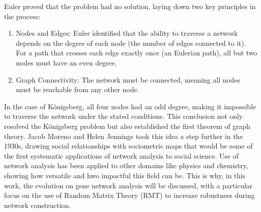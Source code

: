 \documentclass{article}[12pt]
\begin{document}
\noindent Euler proved that the problem had no solution, laying down two key principles in the process:
\begin{enumerate}
    \item Nodes and Edges: Euler identified that the ability to traverse a network depends on the degree of each node (the number of edges connected to it).
    For a path that crosses each edge exactly once (an Eulerian path), all but two nodes must have an even degree.
    \item Graph Connectivity: The network must be connected, meaning all nodes must be reachable from any other node.
\end{enumerate}

\noindent In the case of Königsberg, all four nodes had an odd degree, making it impossible to traverse the network under the stated conditions.
This conclusion not only resolved the Königsberg problem but also established the first theorem of graph theory.
\newpage
Jacob Moreno and Helen Jennings took this idea a step further in the 1930s, drawing social relationships with sociometric maps that would be some of the first systematic applications of network analysis to social science\supercite{moreno_who_1934}.
Use of network analysis has been applied to other domains like physics\supercite{kirchhoff_solution_1958} and chemistry\supercite{arthur_mathematical_1896}, showing how versatile and hwo impactful this field can be.
This is why, in this work, the evolution on gene network analysis will be discussed, with a particular focus on the use of Random Matrix Theory (RMT) to increase robustness during network construction.
\\\\
\end{document}
